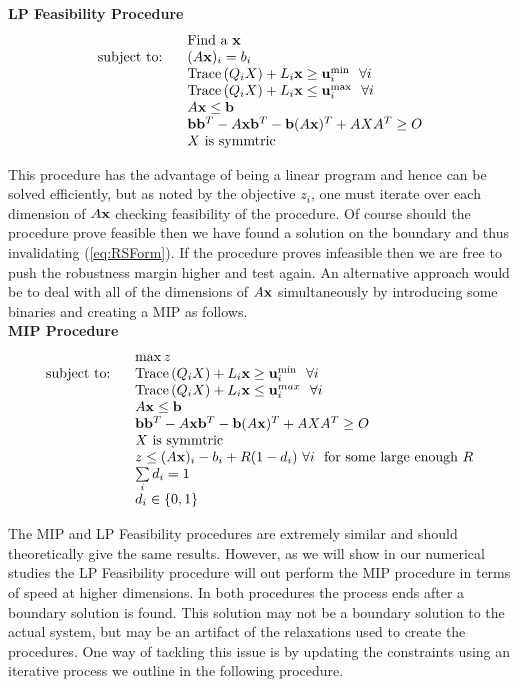 \textbf{LP Feasibility Procedure} 
\begin{equation} \label{eq:OPTfeasrelaxLP1}
\begin{array}{rl}
 &\text{Find a }\mathbf{x} \\
 \text{subject to: } \ &(A\mathbf{x})_i= b_i \\
 &\operatorname{Trace}\left(Q_iX\right)+ L_i\mathbf{x} \geq \mathbf{u}_i^{\min}  \ \ \forall i\\
 & \operatorname{Trace}\left(Q_iX\right)+ L_i\mathbf{x} \leq \mathbf{u}_i^{\max}  \ \ \forall i\\
 	&A\mathbf{x}\leq \mathbf{b} \\
 	&\mathbf{b}\mathbf{b}^T-A\mathbf{x}\mathbf{b}^T-\mathbf{b}(A\mathbf{x})^T+AXA^T\geq O \\
 	&X \text{ is symmtric}
\end{array}
\end{equation}


This procedure has the advantage of being a linear program and hence can be solved efficiently, but as noted by the objective $z_i$, one must iterate over each dimension of $A\mathbf{x}$ checking feasibility of the procedure. 
Of course should the procedure prove feasible then we have found a solution on the boundary and thus invalidating (\cref{eq:RSForm}). 
If the procedure proves infeasible then we are free to push the robustness margin higher and test again. 
An alternative approach would be to deal with all of the dimensions of $A\mathbf{x}$ simultaneously by introducing some binaries and creating a MIP as follows. \\

\textbf{MIP Procedure}\
\begin{equation}\label{eq:OPTfeasrelaxLP2}
\begin{array}{rl}
 & \max z  \\
 \text{subject to: } \ &\operatorname{Trace}\left(Q_iX\right)+ L_i\mathbf{x} \geq \mathbf{u}_i^{\min}  \ \ \forall i\\
 & \operatorname{Trace}\left(Q_iX\right)+ L_i\mathbf{x} \leq \mathbf{u}_i^{max}  \ \ \forall i\\
 	&A\mathbf{x}\leq \mathbf{b} \\
 	&\mathbf{b}\mathbf{b}^T-A\mathbf{x}\mathbf{b}^T-\mathbf{b}(A\mathbf{x})^T+AXA^T\geq O \\
 	&X \text{ is symmtric} \\
 	& z\leq (A\mathbf{x})_i-b_i+R(1-d_i) \ \forall i \ \text{ for some large enough $R$} \\
 	& \sum\limits_i d_i=1 \\
 	& d_i\in\{0,1\}
\end{array}
\end{equation}


The MIP and LP Feasibility procedures are extremely similar and should theoretically give the same results. 
However, as we will show in our numerical studies the LP Feasibility procedure will out perform the MIP procedure in terms of speed at higher dimensions. 
In both procedures the process ends after a boundary solution is found. 
This solution may not be a boundary solution to the actual system, but may be an artifact of the relaxations used to create the procedures. 
One way of tackling this issue is by updating the constraints using an iterative process we outline in the following procedure.\\

